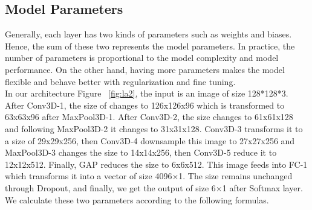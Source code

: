 \subsection{Model Parameters}
Generally, each layer has two kinds of parameters such as weights and biases. Hence, the sum of these two represents the model parameters. In practice, the number of parameters is proportional to the model complexity and model performance. On the other hand, having more parameters makes the model flexible and behave better with regularization and fine tuning.\\

In our architecture Figure ~\ref{fig:la2}, the input is an image of size 128*128*3. After Conv3D-1, the size of changes to 126x126x96 which is transformed to 63x63x96 after MaxPool3D-1. After Conv3D-2, the size changes to 61x61x128 and following MaxPool3D-2 it changes to 31x31x128. Conv3D-3 transforms it to a size of 29x29x256, then Conv3D-4 downsample this image to 27x27x256 and MaxPool3D-3 changes the size to 14x14x256, then Conv3D-5 reduce it to 12x12x512. Finally, GAP reduces the size to 6x6x512. This image feeds into FC-1 which transforms it into a vector of size 4096×1. The size remains unchanged through Dropout, and finally, we get the output of size 6×1 after Softmax layer. We calculate these two parameters according to the following formulas.\\
